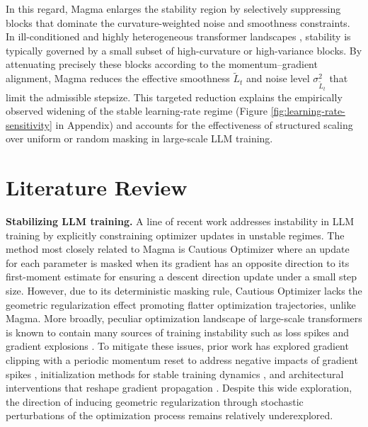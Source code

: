 \documentclass[11pt, a4paper, twocolumn, copyright, goog]{google}
\theoremstyle{plain}
\theoremstyle{definition}
\theoremstyle{remark}
\begin{document}
In this regard, Magma enlarges the stability region by selectively suppressing blocks that dominate the curvature-weighted noise and smoothness constraints. 
In ill-conditioned and highly heterogeneous transformer landscapes \citep{pan2023toward,ahn2023linear,orvieto2025search}, stability is typically governed by a small subset of high-curvature or high-variance blocks. 
By attenuating precisely these blocks according to the momentum–gradient alignment, Magma reduces the effective smoothness $\tilde L_t$ and noise level $\sigma^2_{\tilde L_t}$ that limit the admissible stepsize. 
This targeted reduction explains the empirically observed widening of the stable learning-rate regime (Figure \ref{fig:learning-rate-sensitivity} in Appendix) and accounts for the effectiveness of structured scaling over uniform or random masking in large-scale LLM training.









\section{Literature Review}
\textbf{Stabilizing LLM training.}
A line of recent work addresses instability in LLM training by explicitly constraining optimizer updates in unstable regimes.
The method most closely related to Magma is Cautious Optimizer \citep{liang2024cautious} where an update for each parameter is masked when its gradient has an opposite direction to its first-moment estimate for ensuring a descent direction update under a small step size.
However, due to its deterministic masking rule, Cautious Optimizer lacks the geometric regularization effect promoting flatter optimization trajectories, unlike Magma.
More broadly, peculiar optimization landscape of large-scale transformers is known to contain many sources of training instability such as loss spikes and gradient explosions \citep{chowdhery2023palm}.
To mitigate these issues, prior work has explored gradient clipping with a periodic momentum reset to address negative impacts of gradient spikes \citep{huang2025spam}, initialization methods for stable training dynamics \citep{nguyen2019transformers,takase2023spike}, and architectural interventions that reshape gradient propagation \citep{dettmers20218,xiong2020layer,wang2024deepnet}.
Despite this wide exploration, the direction of inducing geometric regularization through stochastic perturbations of the optimization process remains relatively underexplored.
\end{document}
